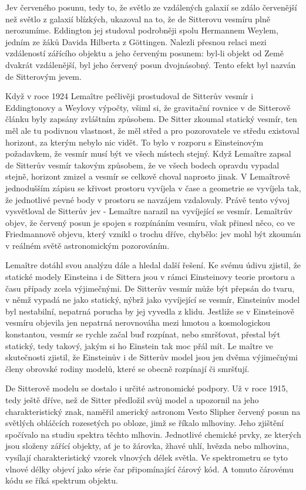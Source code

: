   Jev červeného posunu, tedy to, že světlo ze vzdálených galaxií se zdálo červenější než světlo z
  galaxií blízkých, ukazoval na to, že de Sitterovu vesmíru plně nerozumíme. Eddington jej studoval
  podrobněji spolu Hermannem Weylem, jedním ze žáků Davida Hilberta z Göttingen. Nalezli přesnou
  relaci mezi vzdáleností zářícího objektu a jeho červeným posunem: byl-li objekt od Země dvakrát
  vzdálenější, byl jeho červený posun dvojnásobný. Tento efekt byl nazván de Sitterovým jevem. 
  
  Když v roce 1924 Lemaître pečlivěji prostudoval de Sitterův vesmír i Eddingtonovy a Weylovy
  výpočty, všiml si, že gravitační rovnice v de Sitterově článku byly zapsány zvláštním způsobem. De
  Sitter zkoumal statický vesmír, ten měl ale tu podivnou vlastnost, že měl střed a pro pozorovatele
  ve středu existoval horizont, za kterým nebylo nic vidět. To bylo v rozporu s Einsteinovým
  požadavkem, že vesmír musí být ve všech místech stejný. Když Lemaître zapsal de Sitterův vesmír
  takovým způsobem, že ve všech bodech opravdu vypadal stejně, horizont zmizel a vesmír se celkově
  choval naprosto jinak. V Lemaîtrově jednodušším zápisu se křivost prostoru vyvíjela v čase a
  geometrie se vyvíjela tak, že jednotlivé pevné body v prostoru se navzájem vzdalovaly. Právě tento
  vývoj vysvětloval de Sitterův jev - Lemaître narazil na vyvíjející se vesmír. Lemaîtrův objev, že
  červený posun je spojen s rozpínáním vesmíru, však přinesl něco, co ve Friedmannově objevu, který
  vznikl o trochu dříve, chybělo: jev mohl být zkoumán v reálném světě astronomickým pozorováním.
    
  Lemaître dotáhl svou analýzu dále a hledal další řešení. Ke svému údivu zjistil, že statické
  modely Einsteina i de Sittera jsou v rámci Einsteinovy teorie prostoru a času případy zcela
  výjimečnými. De Sitterův vesmír může být přepsán do tvaru, v němž vypadá ne jako statický, nýbrž
  jako vyvíjející se vesmír, Einsteinův model byl nestabilní, nepatrná porucha by jej vyvedla z
  klidu. Jestliže se v Einsteinově vesmíru objevila jen nepatrná nerovnováha mezi hmotou a
  kosmologickou konstantou, vesmír se rychle začal buď rozpínat, nebo smršťovat, přestal být
  statický, tedy takový, jakým si ho Einstein tak moc přál mít. Le maître ve skutečnosti zjistil, že
  Einsteinův i de Sitterův model jsou jen dvěma výjimečnými členy obrovské rodiny modelů, které se
  obecně rozpínají či smršťují. 
  
  De Sitterově modelu se dostalo i určité astronomické podpory. Už v roce 1915, tedy ještě dříve,
  než de Sitter předložil svůj model a upozornil na jeho charakteristický znak, naměřil americký
  astronom Vesto Slipher červený posun na světlých obláčcích rozesetých po obloze, jimž se říkalo
  mlhoviny. Jeho zjištění spočívalo na studiu spektra těchto mlhovin. Jednotlivé chemické prvky, ze
  kterých jsou složeny zářící objekty, ať je to žárovka, žhavé uhlí, hvězda nebo mlhovina, vysílají
  charakteristický vzorek vlnových délek světla. Ve spektrometru se tyto vlnové délky objeví jako
  série čar připomínající čárový kód. A tomuto čárovému kódu se říká spektrum objektu. 
  
